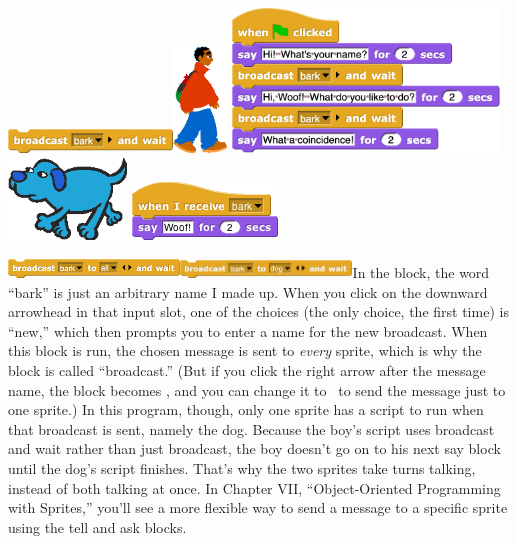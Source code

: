 \includegraphics[width=1.71875in,height=0.24939in]{media/image40.png}\includegraphics[width=0.56944in,height=1.11111in]{media/image41.png}
\includegraphics[width=2.78418in,height=1.51042in]{media/image42.png}
\includegraphics[width=1.24306in,height=0.86111in]{media/image43.png}
\includegraphics[width=1.52083in,height=0.60417in]{media/image44.png}

\includegraphics[width=1.78958in,height=0.2in]{media/image45.png}\includegraphics[width=1.8in,height=0.19167in]{media/image46.png}In
the block, the word ``bark'' is just an arbitrary name I made up. When
you click on the downward arrowhead in that input slot, one of the
choices (the only choice, the first time) is ``new,'' which then prompts
you to enter a name for the new broadcast. When this block is run, the
chosen message is sent to \emph{every} sprite, which is why the block is
called ``broadcast.'' (But if you click the right arrow after the
message name, the block becomes , and you can change it to ~to send the
message just to one sprite.) In this program, though, only one sprite
has a script to run when that broadcast is sent, namely the dog. Because
the boy's script uses broadcast and wait rather than just broadcast, the
boy doesn't go on to his next say block until the dog's script finishes.
That's why the two sprites take turns talking, instead of both talking
at once. In Chapter VII, ``Object-Oriented Programming with Sprites,''
you'll see a more flexible way to send a message to a specific sprite
using the tell and ask blocks.

